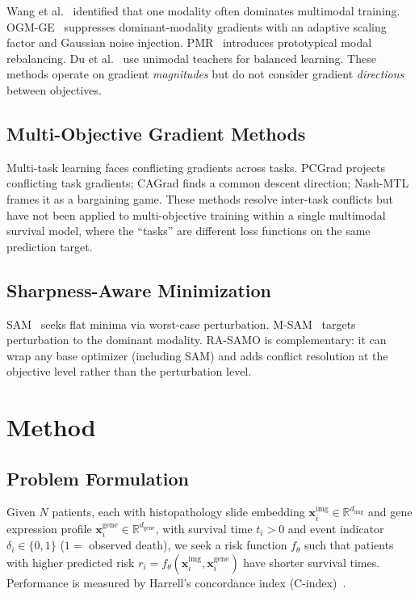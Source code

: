 \documentclass[10pt,twocolumn]{article}
\begin{document}
Wang et al.~\cite{wang2020what} identified that one modality often
dominates multimodal training. OGM-GE~\cite{peng2022ogm} suppresses
dominant-modality gradients with an adaptive scaling factor and
Gaussian noise injection. PMR~\cite{fan2023pmr} introduces prototypical
modal rebalancing. Du et al.~\cite{du2023unimodal} use unimodal
teachers for balanced learning. These methods operate on gradient
\textit{magnitudes} but do not consider gradient \textit{directions}
between objectives.

\subsection{Multi-Objective Gradient Methods}

Multi-task learning faces conflicting gradients across tasks. PCGrad
\cite{yu2020pcgrad} projects conflicting task gradients; CAGrad
\cite{liu2021cagrad} finds a common descent direction; Nash-MTL
\cite{navon2022nashmtl} frames it as a bargaining game. These methods
resolve inter-task conflicts but have not been applied to
multi-objective training within a single multimodal survival model,
where the ``tasks'' are different loss functions on the same
prediction target.

\subsection{Sharpness-Aware Minimization}

SAM~\cite{foret2021sam} seeks flat minima via worst-case perturbation.
M-SAM~\cite{rajoli2025msam} targets perturbation to the dominant
modality. RA-SAMO is complementary: it can wrap any base optimizer
(including SAM) and adds conflict resolution at the objective level
rather than the perturbation level.


\section{Method}

\subsection{Problem Formulation}

Given $N$ patients, each with histopathology slide embedding
$\mathbf{x}_i^{\text{img}} \in \mathbb{R}^{d_{\text{img}}}$ and gene
expression profile
$\mathbf{x}_i^{\text{gene}} \in \mathbb{R}^{d_{\text{gene}}}$, with
survival time $t_i > 0$ and event indicator $\delta_i \in \{0, 1\}$
($1 =$ observed death), we seek a risk function $f_\theta$ such that
patients with higher predicted risk
$r_i = f_\theta(\mathbf{x}_i^{\text{img}},
\mathbf{x}_i^{\text{gene}})$ have shorter survival times.
Performance is measured by Harrell's concordance index
(C-index)~\cite{harrell1996}.
\end{document}
